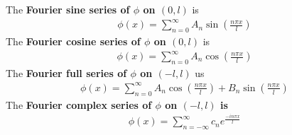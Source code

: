 \documentclass{report}
\begin{document}
\begin{mdframed}
The \textbf{Fourier sine series of $\phi$ on $(0,l)$} is 
  \begin{align*}
  \phi (x)=\sum_{n=0}^{\infty} A_n \sin (\frac{n \pi  x}{l})
  \end{align*}
The \textbf{Fourier cosine series of $\phi$ on $(0,l)$} is 
  \begin{align*}
  \phi (x)=\sum_{n=0}^{\infty} A_n \cos (\frac{n \pi  x}{l})
  \end{align*}
The \textbf{Fourier full series of $\phi$ on $(-l,l)$} us 
\begin{align*}
\phi (x)= \sum_{n=0}^{\infty} A_n \cos (\frac{n \pi  x}{l})+ B_n \sin ( \frac{n \pi  x}{l})
\end{align*}
The \textbf{Fourier complex series of $\phi$ on $(-l,l)$ is}
\begin{align*}
\phi (x)=\sum_{n=-\infty}^{\infty}  c_n e^{\frac{- i n \pi  x}{l}}
\end{align*}
\end{mdframed}
\end{document}
